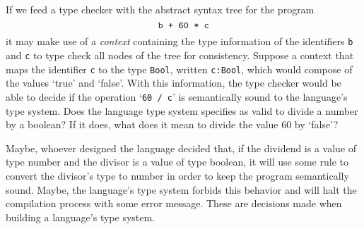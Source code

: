 \documentclass[
  oneside,
  english,
  coorientadorbanca,
  noabntexcite
]{ufsc-thesis-rn46-2019}
\newcommand{\code}[1]{\texttt{#1}}
\begin{document}
If we feed a type checker with the abstract syntax tree for the program
\begin{equation*}
  \verb|b + 60 * c|
\end{equation*}
it may make use of a \textit{context} containing the type information of the identifiers \code{b} and \code{c} to type check all nodes of the tree for consistency.
Suppose a context that maps the identifier \code{c} to the type \code{Bool}, written \code{c:Bool}, which would compose of the values `true' and `false'.
With this information, the type checker would be able to decide if the operation `\verb+60 / c+' is semantically sound to the language's type system.
Does the language type system specifies as valid to divide a number by a boolean?
If it does, what does it mean to divide the value 60 by `false'?

Maybe, whoever designed the language decided that, if the dividend is a value of type number and the divisor is a value of type boolean, it will use some rule to convert the divisor's type to number in order to keep the program semantically sound.
Maybe, the language's type system forbids this behavior and will halt the compilation process with some error message.
These are decisions made when building a language's type system.
\end{document}
